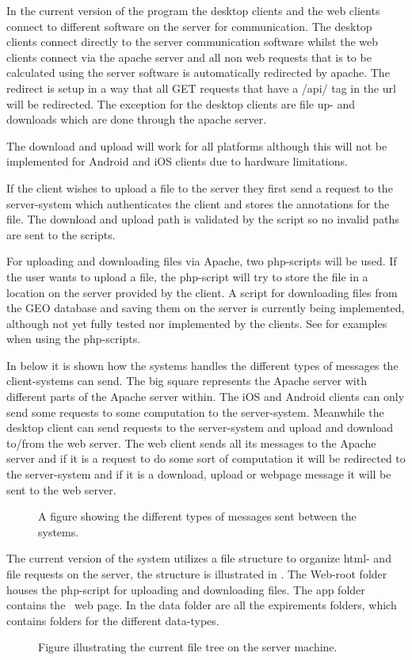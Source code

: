 In the current version of the program the desktop clients and the web clients connect to different software on the server for communication. The desktop clients connect directly to the server communication software whilst the web clients connect via the apache server and all non web requests that is to be calculated using the server software is automatically redirected by apache.
The redirect is setup in a way that all GET requests that have a /api/ tag in the url will be redirected.
The exception for the desktop clients are file up- and downloads which are done through the apache server.

The download and upload will work for all platforms although this will not be implemented for Android and iOS clients due to hardware limitations.

If the client wishes to upload a file to the server they first send a request to the server-system which authenticates the client and stores the annotations for the file. The download and upload path is validated by the script so no invalid paths are sent to the scripts.

For uploading and downloading files via Apache, two php-scripts will be used. If the user wants to upload a file, the php-script will try to store the file in a location on the server provided by the client. A script for downloading files from the GEO database and saving them on the server is currently being  implemented, although not yet fully tested nor implemented by the clients. See  for examples when using the php-scripts.

In  below it is shown how the systems handles the different types of messages the client-systems can send. The big square represents the Apache server with different parts of the Apache server within. The iOS and Android clients can only send some requests to some computation to the server-system. Meanwhile the desktop client can send requests to the server-system and upload and download to/from the web server. The web client sends all its messages to the Apache server and if it is a request to do some sort of computation it will be redirected to the server-system and if it is a download, upload or webpage message it will be sent to the web server.

\begin{figure}[hbt]
\caption{A figure showing the different types of messages sent between the systems.}
\label{fig:exp_flow}
\end{figure}

The current version of the system utilizes a file structure to organize html- and file requests on the server, the structure is illustrated in . The Web-root folder houses the php-script for uploading and downloading files. The app folder contains the \appName\ web page. In the data folder are all the expirements folders, which contains folders for the different data-types.

\begin{figure}[hbt]
\caption{Figure illustrating the current file tree on the server machine.}
\label{fig:exp_filestructure}
\end{figure}
